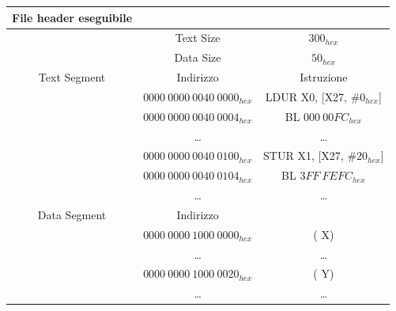 \documentclass[12pt,a4paper]{article}
\begin{document}
\begin{center}
\begin{tabular}{|c|c|c|}
\hline
\textbf{File header eseguibile} &                                &                                                         \\ \hline
                                & Text Size                      & $300_{hex}$                                             \\ \hline
                                & Data Size                      & $50_{hex}$                                              \\ \hline
Text Segment                    & Indirizzo                      & Istruzione                                              \\ \hline
                                & $0000\ 0000\ 0040\ 0000_{hex}$ & LDUR X0, {[}X27,  {\color[HTML]{3531FF}\#$0_{hex}${}}]  \\ \hline
                                & $0000\ 0000\ 0040\ 0004_{hex}$ & BL {\color[HTML]{3531FF} $000\ 00FC_{hex}$}             \\ \hline
                                & \dots                           & \dots                                                    \\ \hline
                                & $0000\ 0000\ 0040\ 0100_{hex}$ & STUR X1, {[}X27, {\color[HTML]{3531FF} \#$20_{hex}${}}] \\ \hline
                                & $0000\ 0000\ 0040\ 0104_{hex}$ & BL {\color[HTML]{3531FF} $3FF\ FEFC_{hex}$}             \\ \hline
                                & \dots                           & \dots                                                    \\ \hline
Data Segment                    & Indirizzo                      & {\color[HTML]{FFCB2F} }                                 \\ \hline
                                & $0000\ 0000\ 1000\ 0000_{hex}$ & ({\color[HTML]{3531FF} X})                              \\ \hline
                                & \dots                           & \dots                                                    \\ \hline
                                & $0000\ 0000\ 1000\ 0020_{hex}$ & ({\color[HTML]{3531FF} Y})                              \\ \hline
                                & \dots                           & \dots                                                    \\ \hline
\end{tabular}
\end{center}
\end{document}
